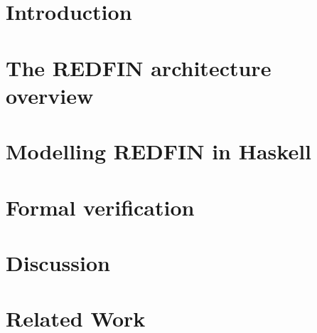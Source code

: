\documentclass[sigplan,10pt,review,anonymous]{acmart}
\begin{document}
\section{Introduction}


\vspace{-1mm}
\section{The REDFIN architecture overview\label{sec-redfin}}
\vspace{-0.5mm}


\vspace{-1.5mm}
\section{Modelling REDFIN in Haskell\label{sec-transformer}}
\vspace{-1mm}


\vspace{-1mm}
\section{Formal verification\label{sec-verification}}
\vspace{-0.5mm}


\section{Discussion\label{sec-discussion}}


\section{Related Work\label{sec-related}}


% 


\end{document}
